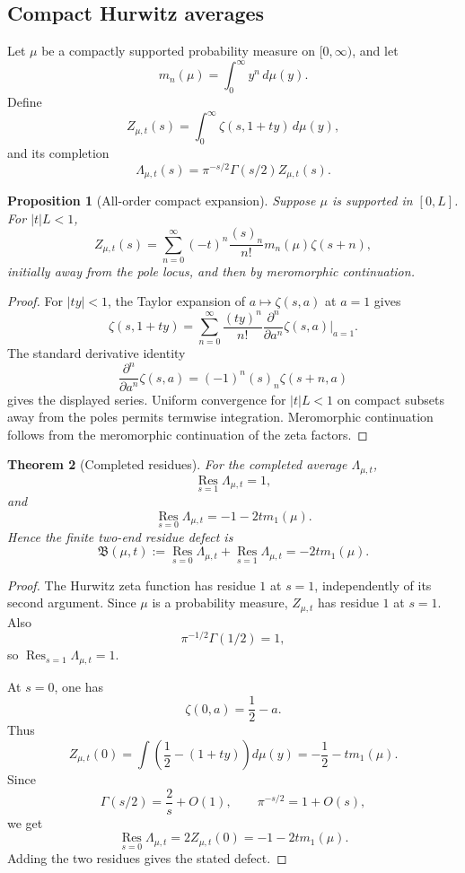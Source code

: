 \documentclass[11pt]{article}
\newcommand{\Res}{\operatorname*{Res}}
\theoremstyle{plain}
\newtheorem{theorem}{Theorem}[section]
\newtheorem{proposition}[theorem]{Proposition}
\theoremstyle{definition}
\begin{document}
\subsection{Compact Hurwitz averages}

Let \(\mu\) be a compactly supported probability measure on \([0,\infty)\), and let
\[
   m_n(\mu)=\int_0^\infty y^n\,d\mu(y).
\]
Define
\[
   Z_{\mu,t}(s)=\int_0^\infty \zeta(s,1+ty)\,d\mu(y),
\]
and its completion
\[
   \Lambda_{\mu,t}(s)=\pi^{-s/2}\Gamma(s/2)Z_{\mu,t}(s).
\]

\begin{proposition}[All-order compact expansion]\label{prop:compact-expansion}
Suppose \(\mu\) is supported in \([0,L]\).  For \(|t|L<1\),
\[
   Z_{\mu,t}(s)=\sum_{n=0}^\infty
   (-t)^n\frac{(s)_n}{n!}m_n(\mu)\zeta(s+n),
\]
initially away from the pole locus, and then by meromorphic continuation.
\end{proposition}

\begin{proof}
For \(|ty|<1\), the Taylor expansion of \(a\mapsto \zeta(s,a)\) at \(a=1\) gives
\[
   \zeta(s,1+ty)=\sum_{n=0}^\infty
   \frac{(ty)^n}{n!}\frac{\partial^n}{\partial a^n}\zeta(s,a)\Big|_{a=1}.
\]
The standard derivative identity
\[
   \frac{\partial^n}{\partial a^n}\zeta(s,a)=(-1)^n(s)_n\zeta(s+n,a)
\]
gives the displayed series.  Uniform convergence for \(|t|L<1\) on compact subsets away from the poles permits termwise integration.  Meromorphic continuation follows from the meromorphic continuation of the zeta factors.
\end{proof}

\begin{theorem}[Completed residues]\label{thm:completed-residues}
For the completed average \(\Lambda_{\mu,t}\),
\[
   \Res_{s=1}\Lambda_{\mu,t}=1,
\]
and
\[
   \Res_{s=0}\Lambda_{\mu,t}=-1-2t m_1(\mu).
\]
Hence the finite two-end residue defect is
\[
   \mathfrak B(\mu,t):=\Res_{s=0}\Lambda_{\mu,t}+\Res_{s=1}\Lambda_{\mu,t}
   =-2t m_1(\mu).
\]
\end{theorem}

\begin{proof}
The Hurwitz zeta function has residue \(1\) at \(s=1\), independently of its second argument.  Since \(\mu\) is a probability measure, \(Z_{\mu,t}\) has residue \(1\) at \(s=1\).  Also
\[
   \pi^{-1/2}\Gamma(1/2)=1,
\]
so \(\Res_{s=1}\Lambda_{\mu,t}=1\).

At \(s=0\), one has
\[
   \zeta(0,a)=\frac12-a.
\]
Thus
\[
   Z_{\mu,t}(0)=\int\left(\frac12-(1+ty)\right)d\mu(y)
   =-\frac12-tm_1(\mu).
\]
Since
\[
   \Gamma(s/2)=\frac2s+O(1),
   \qquad
   \pi^{-s/2}=1+O(s),
\]
we get
\[
   \Res_{s=0}\Lambda_{\mu,t}=2Z_{\mu,t}(0)=-1-2tm_1(\mu).
\]
Adding the two residues gives the stated defect.
\end{proof}
\end{document}
